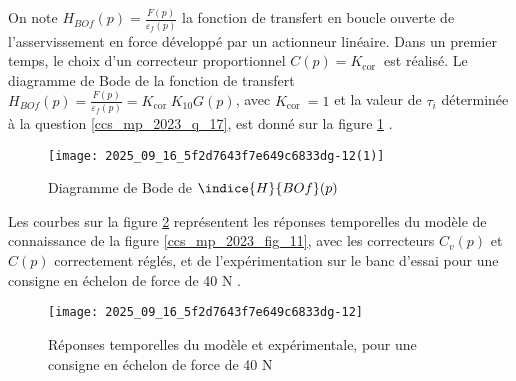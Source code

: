 On note $H_{B O f}(p)=\frac{F(p)}{\varepsilon_{f}(p)}$ la fonction de transfert en boucle ouverte de l'asservissement en force développé par un actionneur linéaire. Dans un premier temps, le choix d'un correcteur proportionnel $C(p)=K_{\text {cor }}$ est réalisé. Le diagramme de Bode de la fonction de transfert $H_{B O f}(p)=\frac{F(p)}{\varepsilon_{f}(p)}=K_{\text {cor }} K_{10} G(p)$, avec $K_{\text {cor }}=1$ et la valeur de $\tau_{i}$ déterminée à la question \ref{ccs_mp_2023_q_17}, est donné sur la figure \ref{ccs_mp_2023_fig_16} .



\begin{figure}[!h]
\centering
\texttt{[image: 2025\_09\_16\_5f2d7643f7e649c6833dg-12(1)]}
\caption{\label{ccs_mp_2023_fig_16}  Diagramme de Bode de $\indice{H}{BO f}(p)$}
\end{figure}


Les courbes sur la figure \ref{ccs_mp_2023_fig_17} représentent les réponses temporelles du modèle de connaissance de la figure \ref{ccs_mp_2023_fig_11}, avec les correcteurs $C_{v}(p)$ et $C(p)$ correctement réglés, et de l'expérimentation sur le banc d'essai pour une consigne en échelon de force de 40 N .
\ifprof
\begin{corrige}
\end{corrige}
\else
\fi




\begin{figure}[!h]
\centering
\texttt{[image: 2025\_09\_16\_5f2d7643f7e649c6833dg-12]}
\caption{\label{ccs_mp_2023_fig_17} Réponses temporelles du modèle et expérimentale, pour une consigne en échelon de force de 40 N}
\end{figure}




